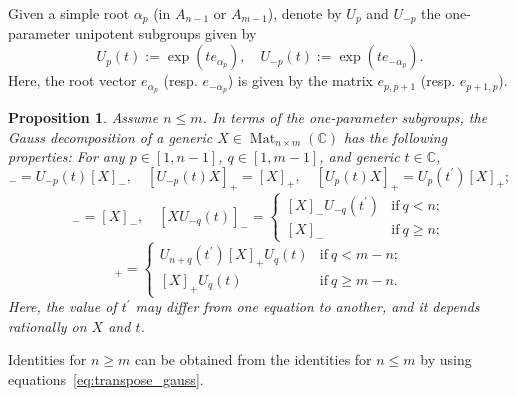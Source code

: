 \documentclass[11pt]{article}
\DeclareMathOperator{\Mat}{Mat}
\newtheorem{proposition}[theorem]{Proposition}%
\theoremstyle{definition}\newtheorem{definition}[theorem]{Definition}
\theoremstyle{definition}\newtheorem{remark}[theorem]{Remark}
\theoremstyle{remark}
\numberwithin{equation}{section}
\begin{document}
Given a simple root $\alpha_p$ (in $A_{n-1}$ or $A_{m-1}$), denote by $U_p$ and $U_{-p}$ the one-parameter unipotent subgroups given by
\begin{equation*}
    U_p(t) := \exp(t e_{\alpha_p}), \quad U_{-p}(t) := \exp (t e_{-\alpha_p}).
\end{equation*}
Here, the root vector $e_{\alpha_p}$ (resp. $e_{-\alpha_p}$) is given by the matrix $e_{p,p+1}$ (resp. $e_{p+1,p}$). 

\begin{proposition}\label{p:gauss_perturb_matr}
    Assume $n \leq m$. In terms of the one-parameter subgroups, the Gauss decomposition of a generic $X \in \Mat_{n\times m}(\mathbb{C})$ has the following properties:
For any $p \in [1,n-1]$, $q \in [1,m-1]$, and generic $t \in \mathbb{C}$,
\begin{equation*}
    [U_{-p}(t) X]_- = U_{-p}(t) [X]_-, \quad [U_{-p}(t) X]_+ = [X]_+, \quad [U_{p}(t)X]_+ = U_{p}(t^{\prime}) [X]_+;
\end{equation*}
\begin{equation*}
    [XU_q(t)]_- =[X]_-, \quad 
    [XU_{-q}(t)]_- = \begin{cases}
        [X]_-U_{-q}(t^\prime) &\text{if} \ q < n;\\
        [X]_-&\text{if} \ q \geq n;
    \end{cases}
\end{equation*}
\begin{equation*}
[XU_q(t)]_+ =  \begin{cases}
   U_{n+q}(t^{\prime})[X]_+ U_q(t) & \text{if} \ q < m-n;\\
         [X]_+U_q(t) & \text{if} \ q \geq m-n.
    \end{cases}
\end{equation*} 
Here, the value of $t^\prime$ may differ from one equation to another, and it depends rationally on $X$ and $t$.
\end{proposition}
Identities for $n \geq m$ can be obtained from the identities for $n \leq m$ by using equations~\eqref{eq:transpose_gauss}.
\end{document}
